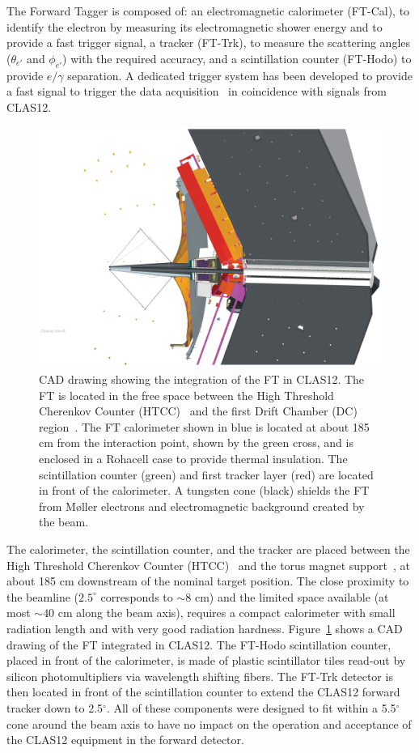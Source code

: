 The Forward Tagger is composed of: 
an electromagnetic calorimeter  (FT-Cal), to identify the
electron by measuring its electromagnetic shower energy and to provide a fast trigger signal, a tracker (FT-Trk),  to measure the scattering angles ($\theta_{e'}$ and $\phi_{e'}$) with the required accuracy, and a  scintillation counter (FT-Hodo) to provide $e/\gamma$ separation. A dedicated trigger system has been developed to provide a fast signal to trigger the data acquisition~\cite{daq} in coincidence with signals from CLAS12.
\begin{figure}[th!]
\centering 
\includegraphics[width=\columnwidth]{./fig/ft_cad.eps} 
\caption{CAD drawing showing the integration of the FT in CLAS12. The FT is located in the free space between the High Threshold Cherenkov Counter (HTCC)~\cite{htcc} and the first Drift Chamber (DC) region~\cite{dc}. The FT calorimeter shown in blue is located at about 185 cm from the interaction point, shown by the green cross, and is enclosed in a Rohacell case to provide thermal insulation. The scintillation counter (green) and first tracker layer (red) are located in front of the calorimeter. A tungsten cone (black) shields the FT from M{\o}ller electrons and electromagnetic background created by the beam. } 
\label{fig:calinclas12} 
\end{figure}

The calorimeter, the scintillation counter, and the tracker
are placed between the High Threshold Cherenkov Counter (HTCC)~\cite{htcc} and the torus magnet support~\cite{magnets}, at about 185 cm downstream of the nominal target position. The close proximity
to the beamline ($2.5^\circ$ corresponds to $\sim 8$ cm) and the limited space available (at most $\sim 40$ cm along the beam axis), requires a compact calorimeter with small radiation length and with very good radiation hardness. Figure~\ref{fig:calinclas12} shows 
a CAD drawing of the FT integrated in CLAS12. 
The FT-Hodo scintillation counter, placed in front of the calorimeter, is made of plastic scintillator tiles 
read-out by silicon photomultipliers via wavelength shifting fibers. The FT-Trk detector is then located in front of the scintillation counter to extend the CLAS12 forward tracker down to 2.5$^\circ$.
All of these components were designed to fit within a 5.5$^{\circ}$ cone around the beam axis to have no impact on the operation and acceptance of the CLAS12 equipment in the forward detector.
